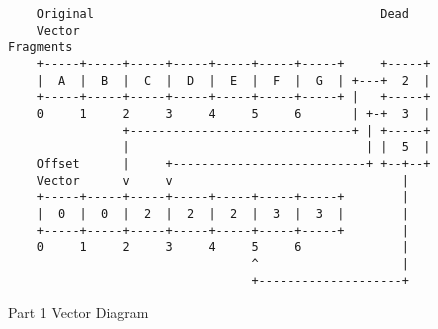 \begin{figure}[H]
\begin{verbatim}
    Original                                        Dead                     
    Vector                                          Fragments                
    +-----+-----+-----+-----+-----+-----+-----+     +-----+                  
    |  A  |  B  |  C  |  D  |  E  |  F  |  G  | +---+  2  |                  
    +-----+-----+-----+-----+-----+-----+-----+ |   +-----+                  
    0     1     2     3     4     5     6       | +-+  3  |                  
                +-------------------------------+ | +-----+                  
                |                                 | |  5  |                  
    Offset      |     +---------------------------+ +--+--+                  
    Vector      v     v                                |                     
    +-----+-----+-----+-----+-----+-----+-----+        |                     
    |  0  |  0  |  2  |  2  |  2  |  3  |  3  |        |                     
    +-----+-----+-----+-----+-----+-----+-----+        |                     
    0     1     2     3     4     5     6              |                     
                                  ^                    |                     
                                  +--------------------+   
\end{verbatim}
\caption{Part 1 Vector Diagram}
\label{code:offset_vector}
\end{figure}

